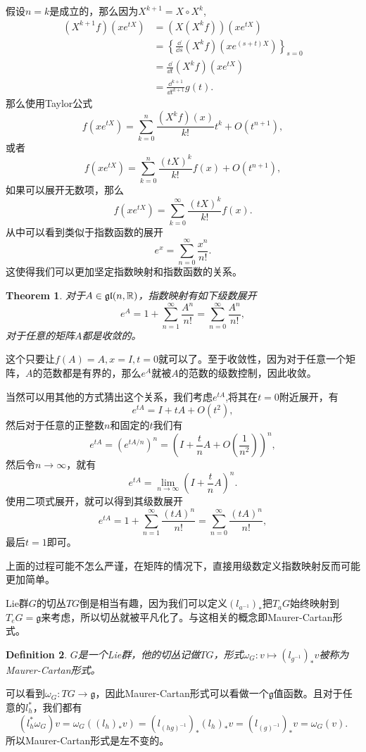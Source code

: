 \documentclass[8pt]{book}
\theoremstyle{plain}
\newtheorem{defi}{Definition}
\newtheorem{theo}[defi]{Theorem}
\newcommand{\lag}{{\mathfrak{g}}}  %
\begin{document}
假设$n=k$是成立的，那么因为$X^{k+1}=X\circ X^k$,
\[
	\begin{split}
	(X^{k+1}f)(x e^{tX})&=(X(X^{k}f))(x e^{tX})\\
	&=\left\{\frac{\dd}{\dd s}(X^kf)(x e^{(s+t)X})\right\}_{s=0}\\
	&=\frac{\dd}{\dd t}(X^kf)(x e^{tX})\\
	&=\frac{\dd^{k+1}}{\dd t^{k+1}}g(t).
	\end{split}
\]
那么使用Taylor公式
\[
	f(xe^{tX})=\sum_{k=0}^n\frac{(X^{k}f)(x)}{k!}t^k+O(t^{n+1}),
\]
或者
\[
	f(xe^{tX})=\sum_{k=0}^n\frac{(tX)^{k}}{k!}f(x)+O(t^{n+1}),
\]
如果可以展开无数项，那么
\[
	f(xe^{tX})=\sum_{k=0}^\infty\frac{(tX)^{k}}{k!}f(x).
\]
从中可以看到类似于指数函数的展开
\[
	e^x=\sum_{n=0}^\infty \frac{x^n}{n!}.
\]
这使得我们可以更加坚定指数映射和指数函数的关系。
\begin{theo}
对于$A\in\mathfrak{gl}(n,\mathbb{R})$，指数映射有如下级数展开
\[
	e^A=1+\sum_{n=1}^\infty \frac{A^n}{n!}=\sum_{n=0}^\infty \frac{A^n}{n!},
\]
对于任意的矩阵$A$都是收敛的。
\end{theo}

这个只要让$f(A)=A,x=I,t=0$就可以了。至于收敛性，因为对于任意一个矩阵，$A$的范数都是有界的，那么$e^A$就被$A$的范数的级数控制，因此收敛。

当然可以用其他的方式猜出这个关系，我们考虑$e^{tA}$,将其在$t=0$附近展开，有
\[
e^{tA}=I+tA+O(t^2),
\]
然后对于任意的正整数$n$和固定的$t$我们有
\[
e^{tA}=\left(e^{tA/n}\right)^n=\left(I+\frac{t}{n}A+O\left(\frac{1}{n^2}\right)\right)^n,
\]
然后令$n\to\infty$，就有
\[
e^{tA}=\lim_{n\to\infty}\left(I+\frac{t}{n}A\right)^n.
\]
使用二项式展开，就可以得到其级数展开
\[
	e^{tA}=1+\sum_{n=1}^\infty \frac{(tA)^n}{n!}=\sum_{n=0}^\infty \frac{(tA)^n}{n!},
\]
最后$t=1$即可。

上面的过程可能不怎么严谨，在矩阵的情况下，直接用级数定义指数映射反而可能更加简单。

Lie群$G$的切丛$TG$倒是相当有趣，因为我们可以定义$(l_{a^{-1}})_*$把$T_aG$始终映射到$T_eG=\lag$来考虑，所以切丛就被平凡化了。与这相关的概念即Maurer-Cartan形式。
\begin{defi}
$G$是一个Lie群，他的切丛记做$TG$，形式$\omega_G:v\mapsto (l_{g^{-1}})_*v$被称为Maurer-Cartan形式。
\end{defi}
可以看到$\omega_G:TG\to \lag$，因此Maurer-Cartan形式可以看做一个$\lag$值函数。且对于任意的$l_h^*$，我们都有
\[
(l_h^*\omega_G)v=\omega_G((l_h)_*v)=(l_{(hg)^{-1}})_*(l_h)_*v=(l_{(g)^{-1}})_*v=\omega_G(v).
\]
所以Maurer-Cartan形式是左不变的。
\end{document}
